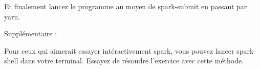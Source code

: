 \documentclass[11pt]{article}
\newcommand{\question}[1] %
{
\refstepcounter{questions} %
\par\noindent %
\phantomsection %
\addcontentsline{faq}{questions}{#1} %
\todo[inline, color=blue!40]{\textbf{#1}} %
\vspace{1em} %
}
\begin{document}


Et finalement lancez le programme au moyen de spark-submit en passant par yarn.




Supplémentaire : 

Pour ceux qui aimerait essayer intéractivement spark, vous pouvez lancer spark-shell dans votre terminal. Essayez de résoudre l'exercice avec cette méthode.




% 
% 
% 
% 
% 
% 
% 
% 
% 
% 
% 
% 
% 
% 
% 
% 
% 
% 
% 
% 
\end{document}
